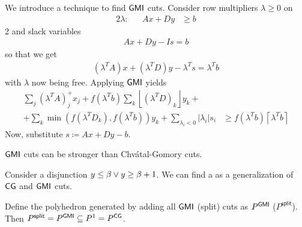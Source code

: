 We introduce a technique to find $\mathsf{GMI}$ cuts.
Consider row multipliers $\lambda \geq 0$ on
\begin{alignat*}{2}
    \lambda: &  & Ax+Dy & \geq b
\end{alignat*}{2}
and slack variables
\begin{align*}
    Ax+Dy - Is = b
\end{align*}
so that we get
\begin{align*}
    (\lambda^TA)x+(\lambda^TD)y - \lambda^Ts = \lambda^Tb
\end{align*}
with $\lambda$ now being free. Applying $\mathsf{GMI}$ yields
\begin{equation*}
    \begin{split}
        \sum_j (\lambda^T A)^+_j x_j + f(\lambda^Tb)\sum_k \left\lfloor (\lambda^T D)_k\right\rfloor y_k + \quad &\\
        + \sum_k \min(f(\lambda^TD_k),f(\lambda^Tb))y_k + \sum_{\lambda_i <0} |\lambda_i|s_i &\geq f(\lambda^Tb)\left\lceil \lambda^Tb \right\rceil
    \end{split}
\end{equation*}
Now, substitute $s \coloneqq Ax + Dy - b$.
\begin{conclusion}
    $\mathsf{GMI}$ cuts can be stronger than Chv\'atal-Gomory cuts.
\end{conclusion}
Consider a disjunction $y \leq \beta \vee y\geq \beta + 1$.
We can find a  as a generalization of $\mathsf{CG}$ and $\mathsf{GMI}$ cuts.
\begin{theorem}
    Define the polyhedron generated by adding all $\mathsf{GMI}$ (split) cuts as $P^{\mathsf{GMI}}$ ($P^{\mathsf{split}}$).
    Then $P^{\mathsf{split}} = P^{\GMI} \subset P^1 = P^{\CG}$.
\end{theorem}